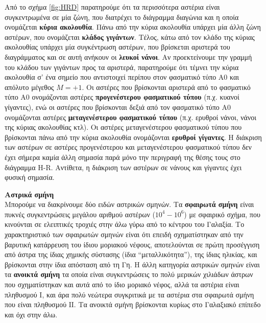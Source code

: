 Από το σχήμα \ref{fig:HRD} παρατηρούμε ότι τα περισσότερα αστέρια είναι συγκεντρωμένα σε μία ζώνη, που διατρέχει το διάγραμμα διαγώνια και η οποία ονομάζεται \textbf{κύρια ακολουθία}. Πάνω από την κύρια ακολουθία υπάρχει μία άλλη ζώνη αστέρων, που ονομάζεται \textbf{κλάδος γιγάντων}. Τέλος, κάτω από τον κλάδο της κύριας ακολουθίας υπάρχει μία συγκέντρωση αστέρων, που βρίσκεται αριστερά του διαγράμματος και σε αυτή ανήκουν οι \textbf{λευκοί νάνοι}. Αν προεκτείνουμε την γραμμή του κλάδου των γιγάντων προς τα αριστερά, παρατηρούμε ότι τέμνει την κύρια ακολουθία σ' ένα σημείο που αντιστοιχεί περίπου στον φασματικό τύπο A0 και απόλυτο μέγεθος $ M = +1$. Οι αστέρες που βρίσκονται αριστερά από το φασματικό τύπο Α0 ονομάζονται αστέρες \textbf{προγενέστερου φασματικού τύπου} (π.χ. κυανοί γίγαντες), ενώ οι αστέρες που βρίσκονται δεξιά από τον φασματικό τύπο Α0 ονομάζονται αστέρες \textbf{μεταγενέστερου φασματικού τύπου} (π.χ. ερυθροί νάνοι, νάνοι της κύριας ακολουθίας κτλ). Οι αστέρες μεταγενέστερου φασματικού τύπου που βρίσκονται πάνω από την κύρια ακολουθία ονομάζονται \textbf{ερυθροί γίγαντες}. Η διάκριση των αστέρων σε αστέρες προγενέστερου και μεταγενέστερου φασματικού τύπου δεν έχει σήμερα καμία άλλη σημασία παρά μόνο την περιγραφή της θέσης τους στο διάγραμμα H-R. Αντίθετα, η διάκριση των αστέρων σε νάνους και γίγαντες έχει φυσική σημασία.

\textbf{Αστρικά σμήνη}\\
Μπορούμε να διακρίνουμε δύο ειδών αστρικών σμηνών. Τα \textbf{σφαιρωτά σμήνη} είναι πυκνές συγκεντρώσεις μεγάλου αριθμού αστέρων ($10^4 - 10^6$) με σφαιρικό σχήμα, που κινούνται σε ελειπτικές τροχιές στην άλω γύρω από το κέντρου του Γαλαξία. Το χαρακτηριστικό των σφαιρωτών σμηνών είναι ότι επειδή σχηματίστηκαν από την βαρυτική κατάρρευση του ίδιου μοριακού νέφους, αποτελούνται σε πρώτη προσέγγιση από άστρα της ίδιας χημικής σύστασης (ίδια ``μεταλλικότητα''), της ίδιας ηλικίας, και βρίσκονται στην ίδια απόσταση από τη Γη.
Η άλλη κατηγορία αστρικών σμηνών είναι τα \textbf{ανοικτά σμήνη} τα οποία είναι συγκεντρώσεις το πολύ μερικών χιλιάδων άστρων που σχηματίστηκαν και αυτά από το ίδιο μοριακό νέφος, αλλά τα αστέρια είναι πληθυσμού I, και άρα πολύ νεώτερα συγκριτικά με τα αστέρια στα σφαιρωτά σμήνη που είναι πληθυσμού ΙΙ. Τα ανοικτά σμήνη βρίσκονται κυρίως στο Γαλαξιακό επίπεδο και όχι στην άλω.


